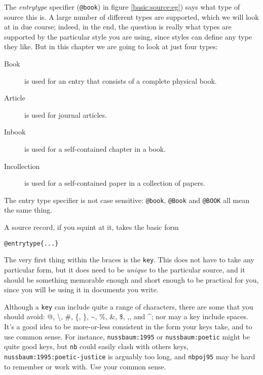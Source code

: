 The \emph{entrytype} specifier (\verb|@book|) in figure
\ref{basic:source:eg}) says what type of source this is. A large
number of different types are supported, which we will look at in due
course; indeed, in the end, the question is really what types are
supported by the particular style you are using, since styles can
define any type they like. But in this chapter we are going to look at
just four types:
\begin{description}
\item[Book] is used for an entry that consists of a complete physical
  book.
\item[Article] is used for journal articles.
\item[Inbook] is used for a self-contained chapter in a
  book.
\item[Incollection] is used for a self-contained paper in a collection
  of papers.
\end{description}

The entry type specifier is not case sensitive: \verb|@book|,
\verb|@Book| and \verb|@BOOK| all mean the same thing.

A source record, if you squint at it, takes the basic form
\begin{center}\verb|@entrytype{...}|\end{center}The very first thing
within the braces is the \verb|key|. This does not have to take any
particular form, but it does need to be \emph{unique} to the
particular source, and it should be something memorable enough and
short enough to be practical for you, since you will be using it in
documents you write.

{\newcommand{\romcom}{{\normalfont , }} 

Although a \verb|key| can include quite a range of characters, there
are some that you should avoid: {\ttfamily \textquotedbl\romcom
    @\romcom \textquotesingle\romcom \textbackslash\romcom \#\romcom
    \{\romcom \}\romcom \textasciitilde\romcom \%\romcom
    \textunderscore\romcom \&\romcom \$\romcom ,\romcom {\normalfont
      and }\^{}}; nor may a key include spaces. It's a good idea to be
more-or-less consistent in the form your keys take, and to use
common sense. For instance, \texttt{nussbaum:1995} or
\texttt{nussbaum:poetic} might be quite good keys, but \texttt{nb}
could easily clash with others keys,
\texttt{nussbaum:1995:poetic-justice} is arguably too long, and
\texttt{nbpoj95} may be hard to remember or work with. Use your
common sense.}

